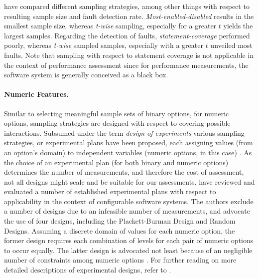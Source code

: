 \cite{medeiros_comparison_2016} have compared different sampling strategies,
among other things with respect to resulting sample size and fault detection
rate. \emph{Most-enabled-disabled} results in the smallest
sample size, whereas \emph{t-wise} sampling, especially for a greater $t$ yields
the largest samples. Regarding the detection of faults,
\emph{statement-coverage} performed poorly, whereas \emph{t-wise} sampled
samples, especially with a greater $t$ unveiled most faults. Note that
sampling with respect to statement coverage is not applicable in the context of
performance assessment since for performance measurements, the software system is generally conceived as a  black
box. 

\paragraph{Numeric Features.}
Similar to selecting meaningful sample sets of binary options, for numeric
options, sampling strategies are designed with respect to covering possible
interactions. Subsumed under the term \emph{design of experiments} various
sampling strategies, or experimental plans have been proposed, each assigning values
(from an option’s domain) to independent variables (numeric options, in this
case) \citep{antony_design_2014}. As the choice of an experimental plan (for
both binary and numeric options) determines the number of measurements, and therefore the cost of
assessment, not all designs might scale and be suitable for our assessments.
\cite{siegmund_performance-influence_2015} have reviewed and evaluated a number
of established experimental plans with respect to applicability in the context
of configurable software systems.
The authors exclude a number of designs due to an infeasible number of measurements, and advocate the use of
four designs, including the Plackett-Burman Design and Random Designs. Assuming
a discrete domain of values for each numeric option, the former design requires
each combination of levels for each pair of numeric options to occur equally.
The latter design is advocated not least because of an negligible number of
constraints among numeric options \citep{siegmund_performance-influence_2015}.
For further reading on more detailed descriptions of experimental designs, refer
to \cite{antony_design_2014}. 

